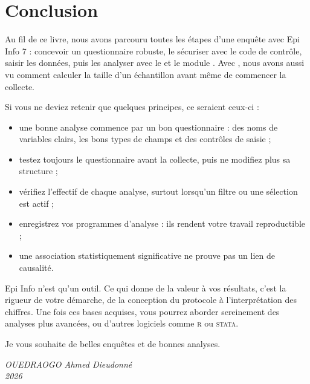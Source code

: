 \chapter*{Conclusion}
\label{conclusion}

Au fil de ce livre, nous avons parcouru toutes les étapes d'une enquête avec Epi Info 7 : concevoir un questionnaire robuste, le sécuriser avec le code de contrôle, saisir les données, puis les analyser avec le  et le module . Avec , nous avons aussi vu comment calculer la taille d'un échantillon avant même de commencer la collecte.

Si vous ne deviez retenir que quelques principes, ce seraient ceux-ci :
\begin{itemize}[label=, font=\color{EPIB}]
	\item une bonne analyse commence par un bon questionnaire : des noms de variables clairs, les bons types de champs et des contrôles de saisie ;
	\item testez toujours le questionnaire avant la collecte, puis ne modifiez plus sa structure ;
	\item vérifiez l'effectif de chaque analyse, surtout lorsqu'un filtre ou une sélection est actif ;
	\item enregistrez vos programmes d'analyse : ils rendent votre travail reproductible ;
	\item une association statistiquement significative ne prouve pas un lien de causalité.
\end{itemize}

Epi Info n'est qu'un outil. Ce qui donne de la valeur à vos résultats, c'est la rigueur de votre démarche, de la conception du protocole à l'interprétation des chiffres. Une fois ces bases acquises, vous pourrez aborder sereinement des analyses plus avancées, ou d'autres logiciels comme \textsc{r} ou \textsc{stata}.

Je vous souhaite de belles enquêtes et de bonnes analyses.

\bigskip
\begin{flushright}
	\textit{OUEDRAOGO Ahmed Dieudonné}\\
	\textit{2026}
\end{flushright}
